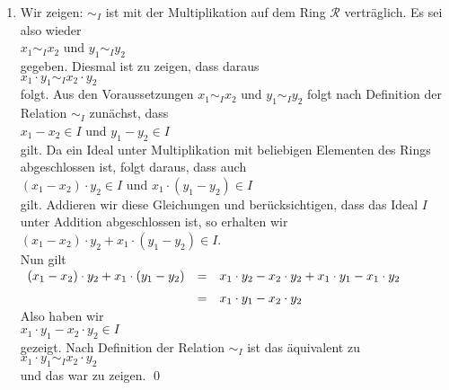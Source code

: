 \begin{enumerate}
\item Wir zeigen: $\sim_I$ ist mit der Multiplikation auf dem Ring $\mathcal{R}$ vertr\"{a}glich.
      Es sei also wieder
      \\[0.2cm]
      \hspace*{1.3cm}
      $x_1 \sim_I x_2$ \quad und \quad $y_1 \sim_I y_2$ 
      \\[0.2cm]
      gegeben.  Diesmal ist zu zeigen, dass daraus
      \\[0.2cm]
      \hspace*{1.3cm}
      $x_1 \cdot y_1 \sim_I x_2 \cdot y_2$
      \\[0.2cm]
      folgt.  Aus den Voraussetzungen $x_1 \sim_I x_2$  und $y_1 \sim_I y_2$ folgt nach Definition
      der Relation $\sim_I$ zun\"{a}chst, dass
      \\[0.2cm]
      \hspace*{1.3cm}
      $x_1 - x_2 \in I$ \quad und \quad $y_1 - y_2 \in I$ 
      \\[0.2cm]
      gilt.  Da ein Ideal unter Multiplikation mit beliebigen Elementen des Rings abgeschlossen ist,
      folgt daraus, dass auch
      \\[0.2cm]
      \hspace*{1.3cm}
      $(x_1 - x_2) \cdot y_2 \in I$ \quad und \quad $x_1 \cdot (y_1 - y_2) \in I$ 
      \\[0.2cm]
      gilt. Addieren wir diese Gleichungen und ber\"{u}cksichtigen, dass das Ideal $I$ unter Addition
      abgeschlossen ist, so erhalten wir
      \\[0.2cm]
      \hspace*{1.3cm}
      $(x_1 - x_2) \cdot y_2 + x_1 \cdot (y_1 - y_2) \in I$.
      \\[0.2cm]
      Nun gilt
      \\[0.2cm]
      \hspace*{1.3cm}
      $
      \begin{array}[t]{lcl}
            (x_1 - x_2) \cdot y_2 + x_1 \cdot (y_1 - y_2) 
      & = & x_1 \cdot y_2 - x_2 \cdot y_2 + x_1 \cdot y_1 - x_1 \cdot y_2 \\[0.2cm]
      & = & x_1 \cdot y_1 - x_2 \cdot y_2
      \end{array}
      $
      \\[0.2cm]
      Also haben wir
      \\[0.2cm]
      \hspace*{1.3cm}
      $x_1 \cdot y_1 - x_2 \cdot y_2 \in I$
      \\[0.2cm] 
      gezeigt. Nach Definition der Relation $\sim_I$ ist das \"{a}quivalent zu
      \\[0.2cm]
      \hspace*{1.3cm}
      $x_1 \cdot y_1 \sim_I x_2 \cdot y_2$ 
      \\[0.2cm]
      und das war zu zeigen. {\color{green}{\checkmark}} \qed
\end{enumerate}

